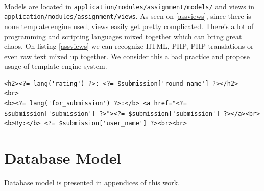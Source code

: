\paragraph{}
Models are located in \texttt{application/modules/assignment/models/} and views in \texttt{application/modules/assignment/views}. As seen on \ref{assviews}, since there is none template engine used, views easily get pretty complicated. There's a lot of programming and scripting languages mixed together which can bring great chaos. On listing \ref{assviews} we can recognize HTML, PHP, PHP translations or even raw text mixed up together. We consider this a bad practice and propose usage of template engine system.

\begin{lstlisting}[label={assviews}, caption={Example of view in assignments module}]
<h2><?= lang('rating') ?>: <?= $submission['round_name'] ?></h2>
<br>
<b><?= lang('for_submission') ?>:</b> <a href="<?= $submission['submission'] ?>"><?= $submission['submission'] ?></a><br>
<b>By:</b> <?= $submission['user_name'] ?><br><br>
\end{lstlisting}


\section{Database Model}
Database model is presented in appendices of this work.
